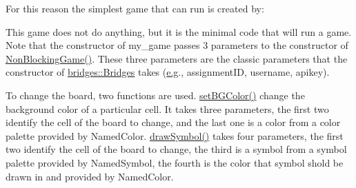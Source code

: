 For this reason the simplest game that can run is created by\+:


\begin{DoxyCode}{0}
\DoxyCodeLine{\};}
\DoxyCodeLine{}
\DoxyCodeLine{\}}
\end{DoxyCode}


This game does not do anything, but it is the minimal code that will run a game. Note that the constructor of my\+\_\+game passes 3 parameters to the constructor of \mbox{\hyperlink{classbridges_1_1game_1_1_non_blocking_game_a3226aa7e7ff129e916f4bd5aabcb2e72}{Non\+Blocking\+Game()}}. These three parameters are the classic parameters that the constructor of \mbox{\hyperlink{classbridges_1_1_bridges}{bridges\+::\+Bridges}} takes (\mbox{\hyperlink{namespacebridges_1_1game_ab9a19c7ab6e2ebac2f95180e21733487ab2f5ff47436671b6e533d8dc3614845d}{e.\+g}}., assignment\+ID, username, apikey).

To change the board, two functions are used. \mbox{\hyperlink{classbridges_1_1game_1_1_game_base_ab667bbca1c81e5fb3aa8d81d70fe8cd2}{set\+B\+G\+Color()}} change the background color of a particular cell. It takes three parameters, the first two identify the cell of the board to change, and the last one is a color from a color palette provided by Named\+Color. \mbox{\hyperlink{classbridges_1_1game_1_1_game_base_a415fa8f70bef364dfa966f2a86048901}{draw\+Symbol()}} takes four parameters, the first two identify the cell of the board to change, the third is a symbol from a symbol palette provided by Named\+Symbol, the fourth is the color that symbol shold be drawn in and provided by Named\+Color.

